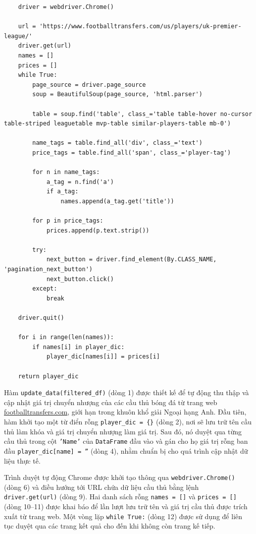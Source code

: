 \documentclass[12pt]{report}
\begin{document}
{\begin{lstlisting}
    driver = webdriver.Chrome()

    url = 'https://www.footballtransfers.com/us/players/uk-premier-league/'
    driver.get(url)
    names = []
    prices = []
    while True:
        page_source = driver.page_source
        soup = BeautifulSoup(page_source, 'html.parser')
        
        table = soup.find('table', class_='table table-hover no-cursor table-striped leaguetable mvp-table similar-players-table mb-0')
        
        name_tags = table.find_all('div', class_='text')
        price_tags = table.find_all('span', class_='player-tag')
        
        for n in name_tags:
            a_tag = n.find('a')
            if a_tag:
                names.append(a_tag.get('title'))

        for p in price_tags:
            prices.append(p.text.strip())
        
        try:
            next_button = driver.find_element(By.CLASS_NAME, 'pagination_next_button')
            next_button.click()
        except:
            break

    driver.quit()
    
    for i in range(len(names)):
        if names[i] in player_dic:
            player_dic[names[i]] = prices[i]
            
    return player_dic
\end{lstlisting}
Hàm \texttt{update\_data(filtered\_df)} (dòng 1) được thiết kế để tự động thu thập và cập nhật giá trị chuyển nhượng của các cầu thủ bóng đá từ trang web \url{footballtransfers.com}, giới hạn trong khuôn khổ giải Ngoại hạng Anh. Đầu tiên, hàm khởi tạo một từ điển rỗng \texttt{player\_dic = \{\}} (dòng 2), nơi sẽ lưu trữ tên cầu thủ làm khóa và giá trị chuyển nhượng làm giá trị. Sau đó, nó duyệt qua từng cầu thủ trong cột \texttt{'Name'} của \texttt{DataFrame} đầu vào và gán cho họ giá trị rỗng ban đầu \texttt{player\_dic[name] = ''} (dòng 4), nhằm chuẩn bị cho quá trình cập nhật dữ liệu thực tế.

Trình duyệt tự động Chrome được khởi tạo thông qua \texttt{webdriver.Chrome()} (dòng 6) và điều hướng tới URL chứa dữ liệu cầu thủ bằng lệnh \texttt{driver.get(url)} (dòng 9). Hai danh sách rỗng \texttt{names = []} và \texttt{prices = []} (dòng 10–11) được khai báo để lần lượt lưu trữ tên và giá trị cầu thủ được trích xuất từ trang web. Một vòng lặp \texttt{while True:} (dòng 12) được sử dụng để liên tục duyệt qua các trang kết quả cho đến khi không còn trang kế tiếp.

}
\end{document}
